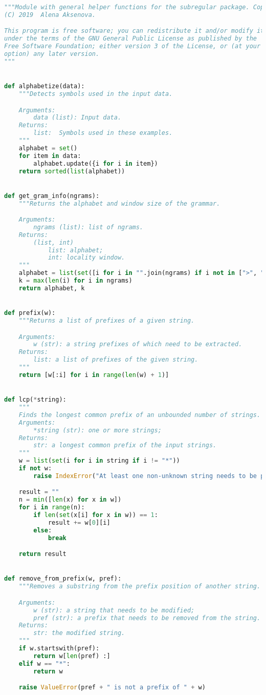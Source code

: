 \begin{lstlisting}[language=Python]
"""Module with general helper functions for the subregular package. Copyright
(C) 2019  Alena Aksenova.

This program is free software; you can redistribute it and/or modify it
under the terms of the GNU General Public License as published by the
Free Software Foundation; either version 3 of the License, or (at your
option) any later version.
"""


def alphabetize(data):
    """Detects symbols used in the input data.

    Arguments:
        data (list): Input data.
    Returns:
        list:  Symbols used in these examples.
    """
    alphabet = set()
    for item in data:
        alphabet.update({i for i in item})
    return sorted(list(alphabet))


def get_gram_info(ngrams):
    """Returns the alphabet and window size of the grammar.

    Arguments:
        ngrams (list): list of ngrams.
    Returns:
        (list, int)
            list: alphabet;
            int: locality window.
    """
    alphabet = list(set([i for i in "".join(ngrams) if i not in [">", "<"]]))
    k = max(len(i) for i in ngrams)
    return alphabet, k


def prefix(w):
    """Returns a list of prefixes of a given string.

    Arguments:
        w (str): a string prefixes of which need to be extracted.
    Returns:
        list: a list of prefixes of the given string.
    """
    return [w[:i] for i in range(len(w) + 1)]


def lcp(*string):
    """
    Finds the longest common prefix of an unbounded number of strings.
    Arguments:
        *string (str): one or more strings;
    Returns:
        str: a longest common prefix of the input strings.
    """
    w = list(set(i for i in string if i != "*"))
    if not w:
        raise IndexError("At least one non-unknown string needs to be provided.")

    result = ""
    n = min([len(x) for x in w])
    for i in range(n):
        if len(set(x[i] for x in w)) == 1:
            result += w[0][i]
        else:
            break

    return result


def remove_from_prefix(w, pref):
    """Removes a substring from the prefix position of another string.

    Arguments:
        w (str): a string that needs to be modified;
        pref (str): a prefix that needs to be removed from the string.
    Returns:
        str: the modified string.
    """
    if w.startswith(pref):
        return w[len(pref) :]
    elif w == "*":
        return w

    raise ValueError(pref + " is not a prefix of " + w)
\end{lstlisting}


